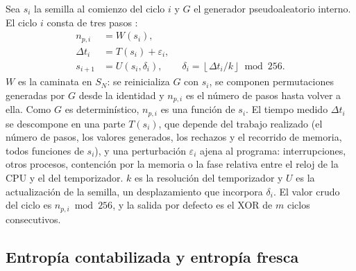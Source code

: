 Sea $s_i$ la semilla al comienzo del ciclo $i$ y $G$ el generador pseudoaleatorio interno. El ciclo $i$ consta de tres pasos \cite{Kuang2025IID-BasedJitter,Vrana2025RawEvaluation}:
\begin{align}
    n_{p,i} &= W(s_i), \label{eq:ciclo_np}\\
    \Delta t_i &= T(s_i) + \varepsilon_i, \label{eq:ciclo_dt}\\
    s_{i+1} &= U(s_i, \delta_i), \qquad \delta_i = \left\lfloor \Delta t_i / k \right\rfloor \bmod 256. \label{eq:ciclo_s}
\end{align}
$W$ es la caminata en $S_N$: se reinicializa $G$ con $s_i$, se componen permutaciones generadas por $G$ desde la identidad y $n_{p,i}$ es el número de pasos hasta volver a ella. Como $G$ es determinístico, $n_{p,i}$ es una función de $s_i$. El tiempo medido $\Delta t_i$ se descompone en una parte $T(s_i)$, que depende del trabajo realizado (el número de pasos, los valores generados, los rechazos y el recorrido de memoria, todos funciones de $s_i$), y una perturbación $\varepsilon_i$ ajena al programa: interrupciones, otros procesos, contención por la memoria o la fase relativa entre el reloj de la CPU y el del temporizador. $k$ es la resolución del temporizador y $U$ es la actualización de la semilla, un desplazamiento que incorpora $\delta_i$. El valor crudo del ciclo es $n_{p,i} \bmod 256$, y la salida por defecto es el XOR de $m$ ciclos consecutivos.

\subsection{Entropía contabilizada y entropía fresca}

